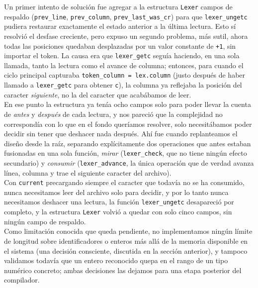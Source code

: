 \documentclass[12pt,letterpaper]{article}
\begin{document}
Un primer intento de solución fue agregar a la estructura \texttt{Lexer} campos de respaldo
(\texttt{prev\_line}, \texttt{prev\_column}, \texttt{prev\_last\_was\_cr}) para que \texttt{lexer\_ungetc}
pudiera restaurar exactamente el estado anterior a la última lectura. Esto sí resolvió el desfase creciente,
pero expuso un segundo problema, más sutil, ahora todas las posiciones quedaban desplazadas por un valor
constante de \texttt{+1}, sin importar el token. La causa era que \texttt{lexer\_getc} seguía haciendo, en una
sola llamada, tanto la lectura como el avance de columna; entonces, para cuando el ciclo principal capturaba
\texttt{token\_column = lex.column} (justo después de haber llamado a \texttt{lexer\_getc} para obtener
\texttt{c}), la columna ya reflejaba la posición del caracter \emph{siguiente}, no la del caracter que
acabábamos de leer.\\

En ese punto la estructura ya tenía ocho campos solo para poder llevar la cuenta de \textit{antes} y
\textit{después} de cada lectura, y nos pareció que la complejidad no correspondía con lo que en el fondo
queríamos resolver, solo necesitábamos poder decidir sin tener que deshacer nada después.
Ahí fue cuando replanteamos el diseño desde la raíz, separando explícitamente dos operaciones que antes estaban
fusionadas en una sola función, \emph{mirar} (\texttt{lexer\_check}, que no tiene ningún efecto secundario) y
\emph{consumir} (\texttt{lexer\_advance}, la única operación que de verdad avanza línea, columna y trae el
siguiente caracter del archivo).\\

Con \texttt{current} precargando siempre el caracter que todavía no se ha consumido, nunca necesitamos leer del
archivo solo para decidir, y por lo tanto nunca necesitamos deshacer una lectura, la función
\texttt{lexer\_ungetc} desapareció por completo, y la estructura \texttt{Lexer} volvió a quedar con solo
cinco campos, sin ningún campo de respaldo.\\

Como limitación conocida que queda pendiente, no implementamos ningún límite de longitud sobre identificadores
o enteros más allá de la memoria disponible en el sistema (una decisión consciente, discutida en la sección
anterior), y tampoco validamos todavía que un entero reconocido quepa en el rango de un tipo numérico
concreto; ambas decisiones las dejamos para una etapa posterior del compilador.


\newpage
\end{document}
